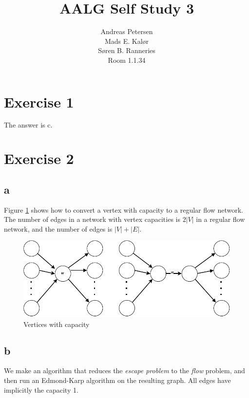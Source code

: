 \documentclass[koma,a4paper]{article}
\title{AALG Self Study 3}
\author{Andreas Petersen\\
Mads E. Kalør\\
Søren B. Ranneries\\
Room 1.1.34}
\begin{document}
\maketitle

\pagebreak

\section{Exercise 1}
The answer is c.

\section{Exercise 2}

\subsection{a}
Figure \ref{fig:vertices_capacity} shows how to convert a vertex with capacity to a regular flow network. The number of edges in a network with vertex capacities is $2|V|$ in a regular flow network, and the number of edges is $|V|+|E|$.

\begin{figure}
  \includegraphics{weighted_vertices}
  \caption{Vertices with capacity}
  \label{fig:vertices_capacity}
\end{figure}

\subsection{b}
We make an algorithm that reduces the \emph{escape problem}  to the \emph{flow} problem, and then run an Edmond-Karp algorithm on the resulting graph. All edges have implicitly the capacity 1.
\end{document}
